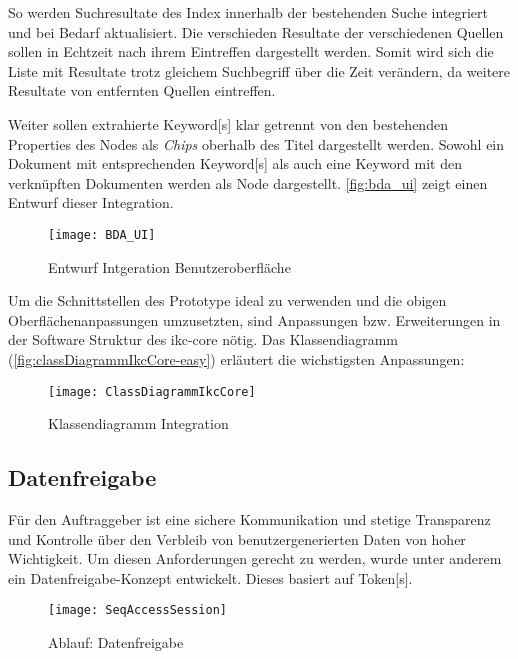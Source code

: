 So werden Suchresultate des Index innerhalb der bestehenden Suche integriert und bei Bedarf aktualisiert. Die verschieden Resultate der verschiedenen Quellen sollen in Echtzeit nach ihrem Eintreffen dargestellt werden. Somit wird sich die Liste mit Resultate trotz gleichem Suchbegriff über die Zeit verändern, da weitere Resultate von entfernten Quellen eintreffen. 

Weiter sollen extrahierte \gls{Keyword}[s] klar getrennt von den bestehenden Properties des Nodes als \textit{Chips} oberhalb des Titel dargestellt werden. Sowohl ein Dokument mit entsprechenden \gls{Keyword}[s] als auch eine \gls{Keyword} mit den verknüpften Dokumenten werden als Node dargestellt. \autoref{fig:bda_ui} zeigt einen Entwurf dieser Integration. 

    \begin{figure}[H]
    \centering
    \texttt{[image: BDA\_UI]}
    \caption{Entwurf Intgeration Benutzeroberfläche}
    \label{fig:bda_ui}
    \end{figure}

Um die Schnittstellen des Prototype ideal zu verwenden und die obigen Oberflächenanpassungen umzusetzten, sind Anpassungen bzw. Erweiterungen in der Software Struktur des \gls{ikc-core} nötig. Das Klassendiagramm (\autoref{fig:classDiagrammIkcCore-easy}) erläutert die wichstigsten Anpassungen:



    \begin{figure}[H]
    \centering
    \texttt{[image: ClassDiagrammIkcCore]}
    \caption{Klassendiagramm Integration}
    \label{fig:classDiagrammIkcCore-easy}
    \end{figure}

\subsection{Datenfreigabe}
Für den Auftraggeber ist eine sichere Kommunikation und stetige Transparenz und Kontrolle über den Verbleib von benutzergenerierten Daten von hoher Wichtigkeit. Um diesen Anforderungen gerecht zu werden, wurde unter anderem ein Datenfreigabe-Konzept entwickelt. Dieses basiert auf \gls{Token}[s]. 







    \begin{figure}[H]
    \centering
    \texttt{[image: SeqAccessSession]}
    \caption{Ablauf: Datenfreigabe}
    \label{fig:seqaccesssession-easy}
    \end{figure}
